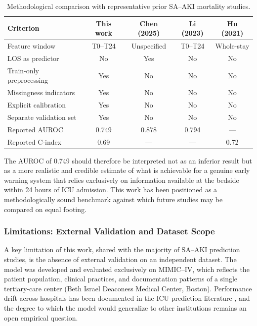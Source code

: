 \begin{table}[htb!]
    \centering
    \caption{Methodological comparison with representative prior SA--AKI mortality studies.}
    \label{tab:comparison_prior}
    \footnotesize
    \setlength{\tabcolsep}{4pt}
    \begin{tabular}{lcccc}
        \toprule
        \textbf{Criterion} & \textbf{This work} & \textbf{Chen (2025)} & \textbf{Li (2023)} & \textbf{Hu (2021)} \\
        \midrule
        Feature window & T0--T24 & Unspecified & T0--T24 & Whole-stay \\
        LOS as predictor & No & Yes & No & No \\
        Train-only preprocessing & Yes & No & No & No \\
        Missingness indicators & Yes & No & No & No \\
        Explicit calibration & Yes & No & No & No \\
        Separate validation set & Yes & No & No & No \\
        Reported AUROC & 0.749 & 0.878 & 0.794 & --- \\
        Reported C-index & 0.69 & --- & --- & 0.72 \\
        \bottomrule
    \end{tabular}
\end{table}

The AUROC of 0.749 should therefore be interpreted not as an inferior result but as a more realistic and credible estimate of what is achievable for a genuine early warning system that relies exclusively on information available at the bedside within 24 hours of ICU admission. This work has been positioned as a methodologically sound benchmark against which future studies may be compared on equal footing.

\subsubsection{Limitations: External Validation and Dataset Scope}\label{sec:external-validation}
A key limitation of this work, shared with the majority of SA--AKI prediction studies, is the absence of external validation on an independent dataset. The model was developed and evaluated exclusively on MIMIC--IV, which reflects the patient population, clinical practices, and documentation patterns of a single tertiary-care center (Beth Israel Deaconess Medical Center, Boston). Performance drift across hospitals has been documented in the ICU prediction literature \citep{Rockenschaub_2024}, and the degree to which the model would generalize to other institutions remains an open empirical question.

